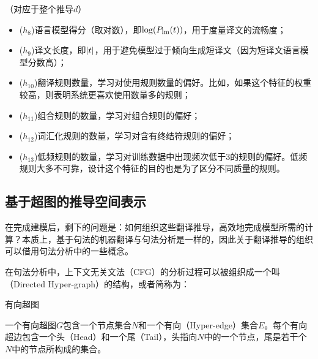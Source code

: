\vspace{0.5em}
（对应于整个推导$d$）

\begin{itemize}
\vspace{0.5em}
\item ($h_{8}$)语言模型得分（取对数），即$\log({P}_{\textrm{lm}}({t}))$，用于度量译文的流畅度；
\vspace{0.5em}
\item ($h_{9}$)译文长度，即$|{t}|$，用于避免模型过于倾向生成短译文（因为短译文语言模型分数高）；
\vspace{0.5em}
\item ($h_{10}$)翻译规则数量，学习对使用规则数量的偏好。比如，如果这个特征的权重较高，则表明系统更喜欢使用数量多的规则；
\vspace{0.5em}
\item ($h_{11}$)组合规则的数量，学习对组合规则的偏好；
\vspace{0.5em}
\item ($h_{12}$)词汇化规则的数量，学习对含有终结符规则的偏好；
\vspace{0.5em}
\item ($h_{13}$)低频规则的数量，学习对训练数据中出现频次低于3的规则的偏好。低频规则大多不可靠，设计这个特征的目的也是为了区分不同质量的规则。
\end{itemize}

\vspace{0.5em}


\subsection{基于超图的推导空间表示}

\parinterval 在完成建模后，剩下的问题是：如何组织这些翻译推导，高效地完成模型所需的计算？本质上，基于句法的机器翻译与句法分析是一样的，因此关于翻译推导的组织可以借用句法分析中的一些概念。

\parinterval 在句法分析中，上下文无关文法（CFG）的分析过程可以被组织成一个叫{\small{}}（Directed Hyper-graph）的结构，或者简称为{\small{}}：

\vspace{0.5em}
\begin{definition} 有向超图

{\small
一个有向超图$G$包含一个节点集合$N$和一个有向{\small{}}（Hyper-edge）集合$E$。每个有向超边包含一个头（Head）和一个尾（Tail），头指向$N$中的一个节点，尾是若干个$N$中的节点所构成的集合。
}
\end{definition}

